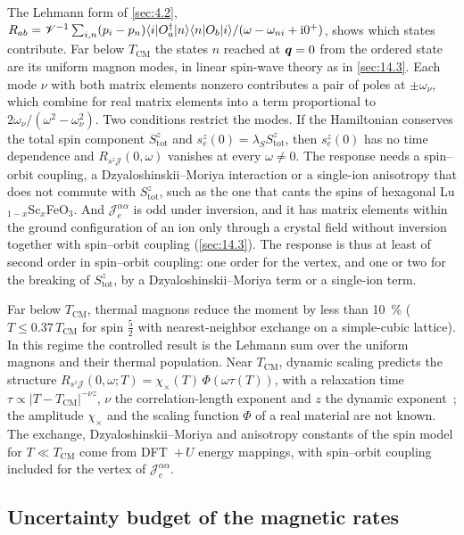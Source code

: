 The Lehmann form of \cref{sec:4.2}, $R_{ab} = \mathscr{V}^{-1}\sum_{i,n}(p_i - p_n)\langle i|O_a^\dagger|n\rangle\langle n|O_b|i\rangle/(\omega - \omega_{ni} + \mathrm{i}0^+)$, shows which states contribute. Far below $T_{\mathrm{CM}}$ the states $n$ reached at $\bm{q} = 0$ from the ordered state are its uniform magnon modes, in linear spin-wave theory as in \cref{sec:14.3}. Each mode $\nu$ with both matrix elements nonzero contributes a pair of poles at $\pm\omega_\nu$, which combine for real matrix elements into a term proportional to $2\omega_\nu/(\omega^2 - \omega_\nu^2)$. Two conditions restrict the modes. If the Hamiltonian conserves the total spin component $S^z_{\mathrm{tot}}$ and $s^z_e(0) = \lambda_SS^z_{\mathrm{tot}}$, then $s^z_e(0)$ has no time dependence and $R_{s^z\mathcal{J}}(0,\omega)$ vanishes at every $\omega \ne 0$. The response needs a spin--orbit coupling, a Dzyaloshinskii--Moriya interaction or a single-ion anisotropy that does not commute with $S^z_{\mathrm{tot}}$, such as the one that cants the spins of hexagonal Lu$_{1-x}$Sc$_x$FeO$_3$. And $\mathcal{J}^{\alpha\alpha}_e$ is odd under inversion, and it has matrix elements within the ground configuration of an ion only through a crystal field without inversion together with spin--orbit coupling (\cref{sec:14.3}). The response is thus at least of second order in spin--orbit coupling: one order for the vertex, and one or two for the breaking of $S^z_{\mathrm{tot}}$, by a Dzyaloshinskii--Moriya term or a single-ion term.

Far below $T_{\mathrm{CM}}$, thermal magnons reduce the moment by less than \SI{10}{\percent} ($T \le 0.37\,T_{\mathrm{CM}}$ for spin $\frac52$ with nearest-neighbor exchange on a simple-cubic lattice). In this regime the controlled result is the Lehmann sum over the uniform magnons and their thermal population. Near $T_{\mathrm{CM}}$, dynamic scaling predicts the structure $R_{s^z\mathcal{J}}(0,\omega;T) = \chi_\times(T)\,\Phi(\omega\tau(T))$, with a relaxation time $\tau \propto |T - T_{\mathrm{CM}}|^{-\nu z}$, $\nu$ the correlation-length exponent and $z$ the dynamic exponent~\cite[Sect.~III\,D]{roising2021axion}; the amplitude $\chi_\times$ and the scaling function $\Phi$ of a real material are not known. The exchange, Dzyaloshinskii--Moriya and anisotropy constants of the spin model for $T \ll T_{\mathrm{CM}}$ come from DFT~$+\,U$ energy mappings, with spin--orbit coupling included for the vertex of $\mathcal{J}^{\alpha\alpha}_e$.

\subsection{Uncertainty budget of the magnetic rates}\label{sec:14.5-budget}

